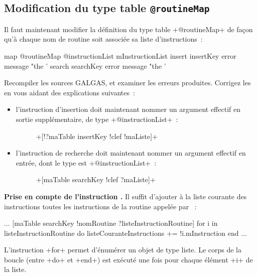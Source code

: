 \subsection{Modification du type table \texttt{@routineMap}}
Il faut maintenant modifier la définition du type table \ggsq+@routineMap+ de façon qu'à chaque nom de routine soit associée sa liste d'instructions~:

\begin{galgas4}
map @routineMap {
  @instructionList mInstructionList
  insert insertKey  error message "the '%
  search searchKey error message "the '%
}
\end{galgas4}

Recompiler les sources GALGAS, et examiner les erreurs produites. Corrigez les en vous aidant des explications suivantes~:
\begin{itemize}
  \item l'instruction d'insertion doit maintenant nommer un argument effectif en sortie supplémentaire, de type \ggsq+@instructionList+~:
  \begin{description}
    \item[ ] \ggsq+[!?maTable insertKey !clef !maListe]+
  \end{description}
  \item l'instruction de recherche doit maintenant nommer un argument effectif en entrée, dont le type est \ggsq+@instructionList+~:
  \begin{description}
    \item[ ] \ggsq+[maTable searchKey !clef ?maListe]+
  \end{description}
\end{itemize}

{\bf Prise en compte de l'instruction .} Il suffit d'ajouter à la liste courante des instructions toutes les instructions de la routine appelée par ~:
\begin{galgas4}
...
[maTable searchKey !nomRoutine ?listeInstructionRoutine]
for i in listeInstructionRoutine do
  listeCouranteInstructions += !i.mInstruction
end
...
\end{galgas4}

L'instruction \ggsq+for+ permet d’énumérer un objet de type liste. Le corps de la boucle (entre \ggsq+do+ et \ggsq+end+) est exécuté une fois pour chaque élément \ggsq+i+ de la liste.








